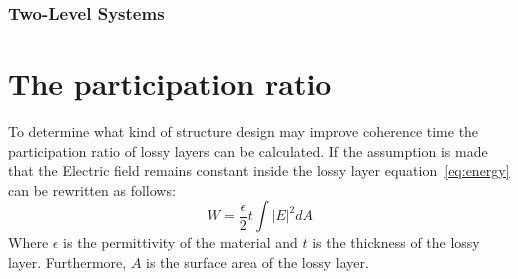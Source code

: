 \subsubsection{Two-Level Systems}

\section{The participation ratio}
To determine what kind of structure design may improve coherence time the participation ratio of lossy layers can be calculated. If the assumption is made that the Electric field remains constant inside the lossy layer equation~\eqref{eq:energy} can be rewritten as follows:
\begin{equation}\label{eq:energy_layer}
W = \frac{\epsilon}{2}t\int{|E|}^{2}dA
\end{equation}
Where \(\epsilon\) is the permittivity of the material and \(t\) is the thickness of the lossy layer. Furthermore, \(A\) is the surface area of the lossy layer.


